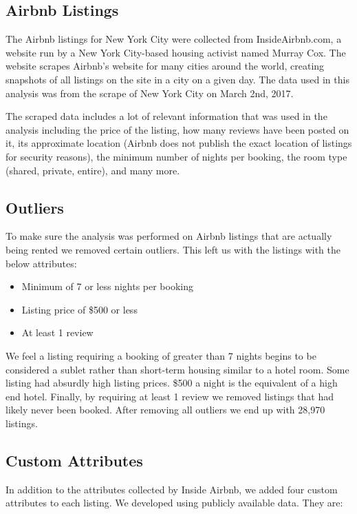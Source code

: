 \documentclass[conference]{IEEEtran}
\begin{document}
\subsection{Airbnb Listings}
The Airbnb listings for New York City were collected from InsideAirbnb.com,\cite{insideairbnb} a
website run by a New York City-based housing activist named Murray Cox. The website
scrapes Airbnb's website for many cities around the world, creating snapshots of all
listings on the site in a city on a given day. The data used in this analysis was from the
scrape of New York City on March 2nd, 2017.

The scraped data includes a lot of relevant information that was used in the analysis
including the price of the listing, how many reviews have been posted on it, its
approximate location (Airbnb does not publish the exact location of listings for security
reasons), the minimum number of nights per booking, the room type (shared, private, entire), and
many more.

\subsection{Outliers}
To make sure the analysis was performed on Airbnb listings that are actually being rented we
removed certain outliers. This left us with the listings with the below attributes:

\begin{itemize}
  \item Minimum of 7 or less nights per booking
  \item Listing price of \$500 or less
  \item At least 1 review
\end{itemize}

We feel a listing requiring a booking of greater than 7 nights begins to be considered a sublet rather
than short-term housing similar to a hotel room. Some listing had absurdly high listing prices. \$500 a night
is the equivalent of a high end hotel. Finally, by requiring at least 1 review we removed
listings that had likely never been booked. After removing all outliers we end up with
28,970 listings.

\subsection{Custom Attributes}
In addition to the attributes collected by Inside Airbnb, we added four custom attributes to each listing.
We developed using publicly available data. They are:
\end{document}

